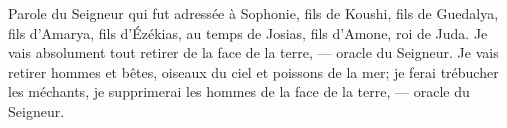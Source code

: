 Parole du Seigneur qui fut adressée à Sophonie,
	fils de Koushi, fils de Guedalya, fils d’Amarya, fils d’Ézékias,
	au temps de Josias, fils d’Amone, roi de Juda.
Je vais absolument tout retirer de la face de la terre, --- oracle du Seigneur.
Je vais retirer hommes et bêtes, oiseaux du ciel et poissons de la mer;
	je ferai trébucher les méchants,
	je supprimerai les hommes de la face de la terre, --- oracle du Seigneur.
